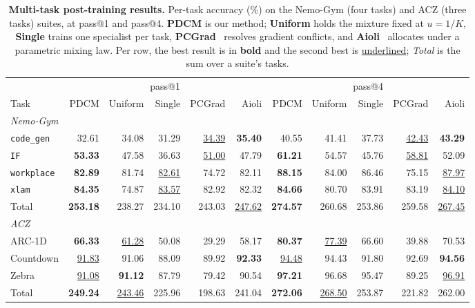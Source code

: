 %
\begin{table}[t]
\centering
\caption{\textbf{Multi-task post-training results.} Per-task accuracy (\%) on the
Nemo-Gym (four tasks) and ACZ (three tasks) suites, at pass@1 and pass@4.
\textbf{PDCM} is our method; \textbf{Uniform} holds the mixture fixed at $u=1/K$,
\textbf{Single} trains one specialist per task, \textbf{PCGrad}~\citep{pcgrad2020}
resolves gradient conflicts, and \textbf{Aioli}~\citep{chen2025aioli} allocates under a
parametric mixing law. Per row, the best result is in \textbf{bold} and the second best is
\underline{underlined}; \emph{Total} is the sum over a suite's tasks.}
\vspace{0.2cm}
\label{tab:main}
\footnotesize
\setlength{\tabcolsep}{3pt}
\begin{tabular}{l rrrrr rrrrr}
\toprule
 & \multicolumn{5}{c}{pass@1} & \multicolumn{5}{c}{pass@4} \\
\cmidrule(lr){2-6} \cmidrule(lr){7-11}
Task & PDCM & Uniform & Single & PCGrad & Aioli & PDCM & Uniform & Single & PCGrad & Aioli \\
\midrule
\multicolumn{11}{l}{\textit{Nemo-Gym}} \\
\texttt{code\_gen} & 32.61 & 34.08 & 31.29 & \underline{34.39} & \textbf{35.40} & 40.55 & 41.41 & 37.73 & \underline{42.43} & \textbf{43.29} \\
\texttt{IF} & \textbf{53.33} & 47.58 & 36.63 & \underline{51.00} & 47.79 & \textbf{61.21} & 54.57 & 45.76 & \underline{58.81} & 52.09 \\
\texttt{workplace} & \textbf{82.89} & 81.74 & \underline{82.61} & 74.72 & 82.11 & \textbf{88.15} & 84.00 & 86.46 & 75.15 & \underline{87.97} \\
\texttt{xlam} & \textbf{84.35} & 74.87 & \underline{83.57} & 82.92 & 82.32 & \textbf{84.66} & 80.70 & 83.91 & 83.19 & \underline{84.10} \\
\cmidrule(lr){1-11}
Total & \textbf{253.18} & 238.27 & 234.10 & 243.03 & \underline{247.62} & \textbf{274.57} & 260.68 & 253.86 & 259.58 & \underline{267.45} \\
\midrule
\multicolumn{11}{l}{\textit{ACZ}} \\
ARC-1D & \textbf{66.33} & \underline{61.28} & 50.08 & 29.29 & 58.17 & \textbf{80.37} & \underline{77.39} & 66.60 & 39.88 & 70.53 \\
Countdown & \underline{91.83} & 91.06 & 88.09 & 89.92 & \textbf{92.33} & \underline{94.48} & 94.43 & 91.80 & 92.69 & \textbf{94.56} \\
Zebra & \underline{91.08} & \textbf{91.12} & 87.79 & 79.42 & 90.54 & \textbf{97.21} & 96.68 & 95.47 & 89.25 & \underline{96.91} \\
\cmidrule(lr){1-11}
Total & \textbf{249.24} & \underline{243.46} & 225.96 & 198.63 & 241.04 & \textbf{272.06} & \underline{268.50} & 253.87 & 221.82 & 262.00 \\
\bottomrule
\end{tabular}
\end{table}
